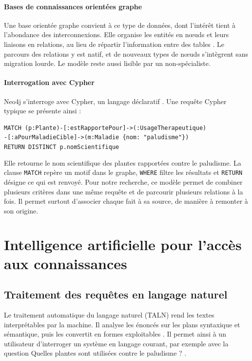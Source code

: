 \paragraph{Bases de connaissances orientées graphe}
Une base orientée graphe convient à ce type de données, dont l'intérêt tient à l'abondance des interconnexions. Elle organise les entités en nœuds et leurs liaisons en relations, au lieu de répartir l'information entre des tables \cite{robinson2015graph}. Le parcours des relations y est natif, et de nouveaux types de nœuds s'intègrent sans migration lourde. Le modèle reste aussi lisible par un non-spécialiste.

\paragraph{Interrogation avec Cypher}
Neo4j s'interroge avec Cypher, un langage déclaratif \cite{francis2018cypher}. Une requête Cypher typique se présente ainsi :
\begin{center}
\texttt{MATCH (p:Plante)-[:estRapportePour]->(:UsageTherapeutique)}\\
\texttt{-[:aPourMaladieCible]->(m:Maladie \{nom: "paludisme"\})}\\
\texttt{RETURN DISTINCT p.nomScientifique}
\end{center}
Elle retourne le nom scientifique des plantes rapportées contre le paludisme. La clause \texttt{MATCH} repère un motif dans le graphe, \texttt{WHERE} filtre les résultats et \texttt{RETURN} désigne ce qui est renvoyé. Pour notre recherche, ce modèle permet de combiner plusieurs critères dans une même requête et de parcourir plusieurs relations à la fois. Il permet surtout d'associer chaque fait à sa source, de manière à remonter à son origine.

\section{Intelligence artificielle pour l'accès aux connaissances}
\label{sec:ia_acces}

\subsection{Traitement des requêtes en langage naturel}
\label{subsec:taln}

Le traitement automatique du langage naturel (TALN) rend les textes interprétables par la machine. Il analyse les énoncés sur les plans syntaxique et sémantique, puis les convertit en formes exploitables \cite{jurafsky2023slp}. Il permet ainsi à un utilisateur d'interroger un système en langage courant, par exemple avec la question \og Quelles plantes sont utilisées contre le paludisme ? \fg.

